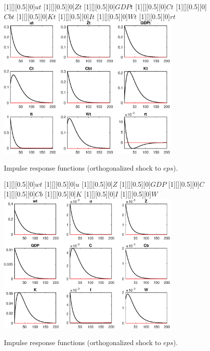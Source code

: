  
\begin{figure}[H]
[1][][0.5][0]{$ut$}
[1][][0.5][0]{$Zt$}
[1][][0.5][0]{$GDPt$}
[1][][0.5][0]{$Ct$}
[1][][0.5][0]{$Cbt$}
[1][][0.5][0]{$Kt$}
[1][][0.5][0]{$It$}
[1][][0.5][0]{$Wt$}
[1][][0.5][0]{$rt$}
\centering 
\includegraphics[width=0.80\textwidth]{DyTruncation/graphs/DyTruncation_IRF_eps1}
\caption{Impulse response functions (orthogonalized shock to $eps$).}\label{Fig:IRF:eps:1}
\end{figure}
 
\begin{figure}[H]
[1][][0.5][0]{$wt$}
[1][][0.5][0]{$u$}
[1][][0.5][0]{$Z$}
[1][][0.5][0]{$GDP$}
[1][][0.5][0]{$C$}
[1][][0.5][0]{$Cb$}
[1][][0.5][0]{$K$}
[1][][0.5][0]{$I$}
[1][][0.5][0]{$W$}
\centering 
\includegraphics[width=0.80\textwidth]{DyTruncation/graphs/DyTruncation_IRF_eps2}
\caption{Impulse response functions (orthogonalized shock to $eps$).}\label{Fig:IRF:eps:2}
\end{figure}
 
